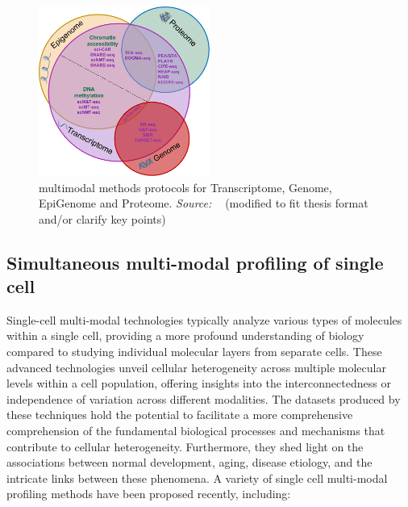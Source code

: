 \begin{figure}[!ht]
	\centering
	\includegraphics[width=0.50\textwidth]{multi-model-methods/fig}
	\vspace{0.1cm}
	\caption[multimodal methods protocols for Transcriptome, Genome, EpiGenome and Proteome]{multimodal methods protocols for Transcriptome, Genome, EpiGenome and Proteome. \emph{Source: ~\cite{lee2020single}} (modified to fit thesis format and/or clarify key points)}
	\label{fig:piechart-mulitmodal-methods}
\end{figure}



\subsection{Simultaneous multi-modal profiling of single cell}
\label{background:sec1:mulitmodal}
Single-cell multi-modal technologies typically analyze various types of molecules within a single cell, providing a more profound understanding of biology compared to studying individual molecular layers from separate cells. These advanced technologies unveil cellular heterogeneity across multiple molecular levels within a cell population, offering insights into the interconnectedness or independence of variation across different modalities. The datasets produced by these techniques hold the potential to facilitate a more comprehensive comprehension of the fundamental biological processes and mechanisms that contribute to cellular heterogeneity. Furthermore, they shed light on the associations between normal development, aging, disease etiology, and the intricate links between these phenomena. A variety of single cell multi-modal profiling methods have been proposed recently, including:

